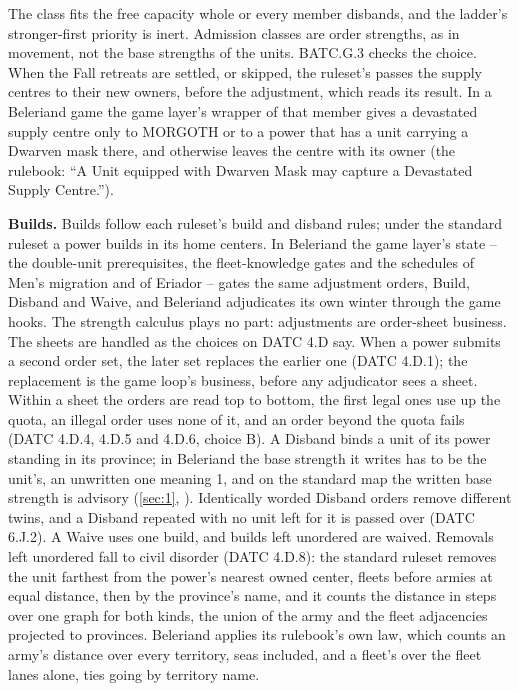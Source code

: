 \documentclass[12pt,a4paper]{article}
\begin{document}
The class fits the free capacity whole or every member disbands, and the ladder's stronger-first priority is inert.
Admission classes are order strengths, as in movement, not the base strengths of the units.
BATC.G.3 checks the choice.\\
When the Fall retreats are settled, or skipped, the ruleset's  passes the supply centres to their new owners, before the adjustment, which reads its result.
In a Beleriand game the game layer's wrapper of that member gives a devastated supply centre only to MORGOTH or to a power that has a unit carrying a Dwarven mask there, and otherwise leaves the centre with its owner (the rulebook: ``A Unit equipped with Dwarven Mask may capture a Devastated Supply Centre.'').

\textbf{Builds.}
Builds follow each ruleset's build and disband rules; under the standard ruleset a power builds in its home centers.
In Beleriand the game layer's state -- the double-unit prerequisites, the fleet-knowledge gates and the schedules of Men's migration and of Eriador -- gates the same adjustment orders, Build, Disband and Waive, and Beleriand adjudicates its own winter through the game hooks.
The strength calculus plays no part: adjustments are order-sheet business.\\
The sheets are handled as the choices on DATC 4.D say.
When a power submits a second order set, the later set replaces the earlier one (DATC 4.D.1); the replacement is the game loop's business, before any adjudicator sees a sheet.
Within a sheet the orders are read top to bottom, the first legal ones use up the quota, an illegal order uses none of it, and an order beyond the quota fails (DATC 4.D.4, 4.D.5 and 4.D.6, choice B).
A Disband binds a unit of its power standing in its province; in Beleriand the base strength it writes has to be the unit's, an unwritten one meaning 1, and on the standard map the written base strength is advisory (\cref{sec:1}, ).
Identically worded Disband orders remove different twins, and a Disband repeated with no unit left for it is passed over (DATC 6.J.2).
A Waive uses one build, and builds left unordered are waived.
Removals left unordered fall to civil disorder (DATC 4.D.8): the standard ruleset removes the unit farthest from the power's nearest owned center, fleets before armies at equal distance, then by the province's name, and it counts the distance in steps over one graph for both kinds, the union of the army and the fleet adjacencies projected to provinces.
Beleriand applies its rulebook's own law, which counts an army's distance over every territory, seas included, and a fleet's over the fleet lanes alone, ties going by territory name.
\end{document}
